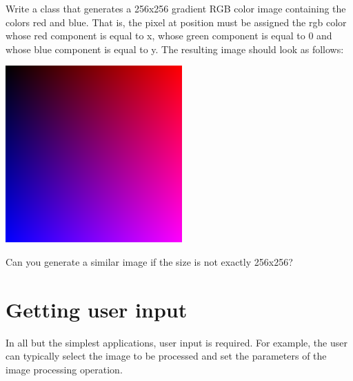 \documentclass{book}
\begin{document}
\begin{exercise}
Write a class  that generates a 256x256 gradient RGB color image containing the colors red and blue. That is, the pixel at position  must be assigned the rgb color whose red component is equal to x, whose green component is equal to 0 and whose blue component is equal to y. The resulting image should look as follows:

\begin{center}
\includegraphics[scale=0.3]{rgb-gradient.png}
\end{center}

Can you generate a similar image if the size is not exactly 256x256?
\end{exercise}

\section{Getting user input}
In all but the simplest applications, user input is required. For example, the user can typically select the image to be processed and set the parameters of the image processing operation.
\end{document}
